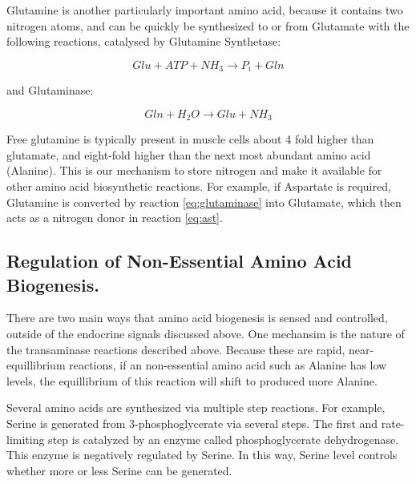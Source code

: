 \documentclass{tufte-handout}
\begin{document}
  Glutamine is another particularly important amino acid, because it contains two nitrogen atoms, and can be quickly be synthesized to or from Glutamate with the following reactions, catalysed by Glutamine Synthetase:

\begin{equation}
Glu + ATP +  NH_3 \rightarrow  P_i + Gln
\end{equation}

and Glutaminase:

\begin{equation}\label{eq:glutaminase} 
Gln + H_2O \rightarrow Glu + NH_3
\end{equation}

Free glutamine is typically present in muscle cells about 4 fold higher than glutamate, and eight-fold higher than the next most abundant amino acid (Alanine).  This is our mechanism to store nitrogen and make it available for other amino acid biosynthetic reactions.  For example, if Aspartate is required, Glutamine is converted by reaction \ref{eq:glutaminase} into Glutamate, which then acts as a nitrogen donor in reaction \ref{eq:ast}.

\subsection{Regulation of Non-Essential Amino Acid Biogenesis.}

There are two main ways that amino acid biogenesis is sensed and controlled, outside of the endocrine signals discussed above.  One mechansim is the nature of the transaminase reactions described above.  Because these are rapid, near-equillibrium reactions, if an non-essential amino acid such as Alanine has low levels, the equillibrium of this reaction will shift to produced more Alanine.

  Several amino acids are synthesized via multiple step reactions.  For example, Serine is generated from 3-phosphoglycerate via several steps.  The first and rate-limiting step is catalyzed by an enzyme called phosphoglycerate dehydrogenase.  This enzyme is negatively regulated by Serine.  In this way, Serine level controls whether more or less Serine can be generated.
\end{document}
